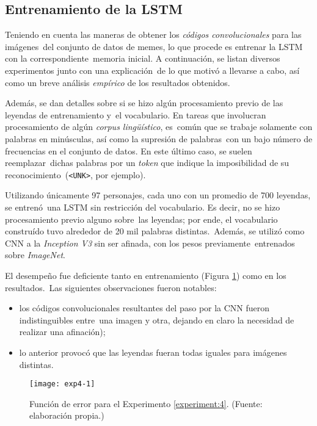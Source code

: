 \subsection{Entrenamiento de la LSTM}

\noindent
Teniendo en cuenta las maneras de obtener los \emph{códigos convolucionales} para las imágenes\
del conjunto de datos de memes, lo que procede es entrenar la LSTM con la correspondiente\
memoria inicial. A continuación, se listan diversos experimentos junto con una explicación\
de lo que motivó a llevarse a cabo, así como un breve análisis \emph{empírico} de los resultados obtenidos.\par
Además, se dan detalles sobre si se hizo algún procesamiento previo de las leyendas de entrenamiento y\
el vocabulario. En tareas que involucran procesamiento de algún \emph{corpus lingüístico}, es\
común que se trabaje solamente con palabras en minúsculas, así como la supresión de palabras\
con un bajo número de frecuencias en el conjunto de datos. En este último caso, se suelen reemplazar\
dichas palabras por un \emph{token} que indique la imposibilidad de su reconocimiento\
(\verb+<UNK>+, por ejemplo).

\begin{experiment} \label{experiment:4}
  Utilizando únicamente 97 personajes, cada uno con un promedio de 700 leyendas, se entrenó\
  una LSTM sin restricción del vocabulario. Es decir, no se hizo procesamiento previo alguno sobre\
  las leyendas; por ende, el vocabulario construído tuvo alrededor de 20 mil palabras distintas.\
  Además, se utilizó como CNN a la \emph{Inception V3} sin ser afinada, con los pesos previamente\
  entrenados sobre \emph{ImageNet}.\par
  El desempeño fue deficiente tanto en entrenamiento (Figura \ref{exp4}) como en los resultados.\
  Las siguientes observaciones fueron notables:
  \begin{itemize}
  \item los códigos convolucionales resultantes del paso por la CNN fueron indistinguibles entre\
    una imagen y otra, dejando en claro la necesidad de realizar una afinación);
  \item lo anterior provocó que las leyendas fueran todas iguales para imágenes distintas.
  \end{itemize}
\end{experiment}

\begin{figure}[h]
  \texttt{[image: exp4-1]}
  \caption{
    Función de error para el Experimento \ref{experiment:4}.
    (Fuente: elaboración propia.)
  }
  \label{exp4}
\end{figure}

